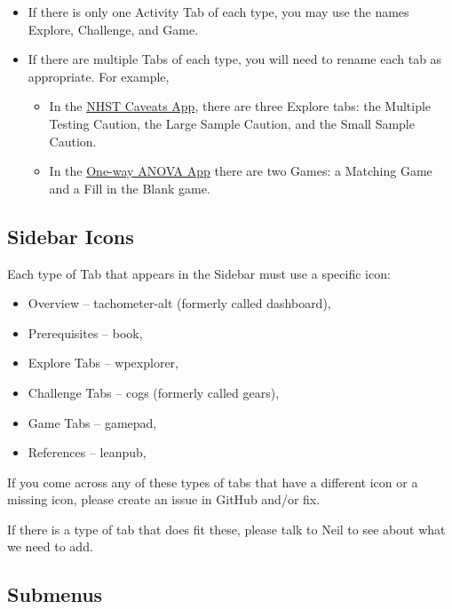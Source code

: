 \documentclass[
]{book}
\providecommand{\tightlist}{%
  \setlength{\itemsep}{0pt}\setlength{\parskip}{0pt}}
\begin{document}
\begin{itemize}
\tightlist
\item
  If there is only one Activity Tab of each type, you may use the names Explore, Challenge, and Game.
\item
  If there are multiple Tabs of each type, you will need to rename each tab as appropriate. For example,

  \begin{itemize}
  \tightlist
  \item
    In the \href{https://psu-eberly.shinyapps.io/Significance_Testing_Caveats/}{NHST Caveats App}, there are three Explore tabs: the Multiple Testing Caution, the Large Sample Caution, and the Small Sample Caution.
  \item
    In the \href{https://psu-eberly.shinyapps.io/OneWay_ANOVA/}{One-way ANOVA App} there are two Games: a Matching Game and a Fill in the Blank game.
  \end{itemize}
\end{itemize}

\hypertarget{sidebar-icons}{%
\subsection{Sidebar Icons}\label{sidebar-icons}}

Each type of Tab that appears in the Sidebar must use a specific icon:

\begin{itemize}
\tightlist
\item
  Overview -- tachometer-alt (formerly called dashboard), 
\item
  Prerequisites -- book, 
\item
  Explore Tabs -- wpexplorer, 
\item
  Challenge Tabs -- cogs (formerly called gears), \\
\item
  Game Tabs -- gamepad, 
\item
  References -- leanpub, 
\end{itemize}

If you come across any of these types of tabs that have a different icon or a missing icon, please create an issue in GitHub and/or fix.

If there is a type of tab that does fit these, please talk to Neil to see about what we need to add.

\hypertarget{submenus}{%
\subsection{Submenus}\label{submenus}}
\end{document}
